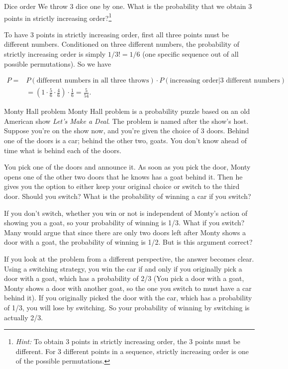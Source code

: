 \begin{problem}{Dice order}
We throw 3 dice one by one. What is the probability that we obtain 3 points in strictly increasing order?\footnote[15]{\emph{Hint:} To obtain 3 points in strictly increasing order, the 3 points must be different. For 3 different points in a sequence, strictly increasing order is one of the possible permutations.}
\end{problem}

\begin{solution}
To have 3 points in strictly increasing order, first all three points must be different numbers. Conditioned on three different numbers, the probability of strictly increasing order is simply $1/3!=1/6$ (one specific sequence out of all possible permutations). So we have

\[
\begin{aligned}
P={}&P(\text{different numbers in all three throws})\cdot P(\text{increasing order}\vert3\text{ different numbers})\\
&=(1\cdot\frac{5}{6}\cdot\frac{4}{6})\cdot\frac{1}{6}=\frac{5}{54}.
\end{aligned}
\]

\end{solution}

\begin{problem}{Monty Hall problem}
Monty Hall problem is a probability puzzle based on an old American show \emph{Let's Make a Deal}. The problem is named after the show's host. Suppose you're on the show now, and you're given the choice of 3 doors. Behind one of the doors is a car; behind the other two, goats. You don't know ahead of time what is behind each of the doors.

You pick one of the doors and announce it. As soon as you pick the door, Monty opens one of the other two doors that he knows has a goat behind it. Then he gives you the option to either keep your original choice or switch to the third door. Should you switch? What is the probability of winning a car if you switch?
\end{problem}

\begin{solution}
If you don't switch, whether you win or not is independent of Monty's action of showing you a goat, so your probability of winning is 1/3. What if you switch? Many would argue that since there are only two doors left after Monty shows a door with a goat, the probability of winning is 1/2. But is this argument correct?

If you look at the problem from a different perspective, the answer becomes clear. Using a switching strategy, you win the car if and only if you originally pick a door with a goat, which has a probability of 2/3 (You pick a door with a goat, Monty shows a door with another goat, so the one you switch to must have a car behind it). If you originally picked the door with the car, which has a probability of 1/3, you will lose by switching. So your probability of winning by switching is actually 2/3.
\end{solution}
